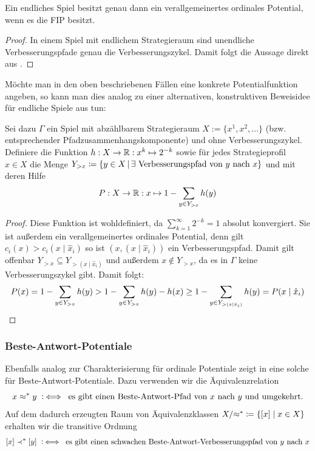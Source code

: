 \begin{kor}\label{kor:CharExVerOrdFIP}
	Ein endliches Spiel besitzt genau dann ein verallgemeinertes ordinales Potential, wenn es die FIP besitzt.
\end{kor}

\begin{proof}
	In einem Spiel mit endlichem Strategieraum sind unendliche Verbesserungspfade genau die Verbesserungszykel. Damit folgt die Aussage direkt aus .
\end{proof}

\begin{bem}
	Möchte man in den oben beschriebenen Fällen eine konkrete Potentialfunktion angeben, so kann man dies analog zu einer alternativen, konstruktiven Beweisidee für endliche Spiele aus \cite[Abschnitt 5]{CongGamesPlayerSpecPayoff} tun:

	Sei dazu $\Gamma$ ein Spiel mit abzählbarem Strategieraum $X := \{x^1, x^2, \dots \}$ (bzw. entsprechender Pfadzusammenhangskomponente) und ohne Verbesserungszykel. Definiere die Funktion $h: X \to \mathbb{R}: x^k \mapsto 2^{-k}$ sowie für jedes Strategieprofil $x \in X$ die Menge $Y_{>x} \coloneqq \left\{y \in X \,\middle|\, \exists \text{ Verbesserungspfad von } y \text{ nach } x\right\}$ und mit deren Hilfe
	\[P: X \to \mathbb{R}: x \mapsto 1 - \sum_{y \in Y_{>x}} h(y)\]
\end{bem}

\begin{proof}
	Diese Funktion ist wohldefiniert, da $\sum_{k=1}^{\infty} 2^{-k} = 1$ absolut konvergiert. Sie ist außerdem ein verallgemeinertes ordinales Potential, denn gilt $c_i(x) > c_i(x \mid \hat{x}_i)$ so ist $(x, (x \mid \hat{x}_i))$ ein Verbesserungspfad. Damit gilt offenbar $Y_{>x} \subseteq Y_{>(x \mid \hat{x}_i)}$ und außerdem $x \notin Y_{>x}$, da es in $\Gamma$ keine Verbesserungszykel gibt. Damit folgt:
		\[P(x) = 1 - \sum_{y \in Y_{>x}} h(y) > 1 - \sum_{y \in Y_{>x}} h(y) - h(x) \geq 1 - \sum_{y \in Y_{>(x \mid \hat{x}_i)}}h(y) = P(x \mid \hat{x}_i)\qedhere\]
\end{proof}


\subsubsection{Beste-Antwort-Potentiale}

Ebenfalls analog zur Charakterisierung für ordinale Potentiale zeigt \citeauthor{BestRespPot} in \cite[Theorem 3.1]{BestRespPot} eine solche für Beste-Antwort-Potentiale. Dazu verwenden wir die Äquivalenzrelation
	\[x \approx^\ast y \mathbin{~\mathop:\!\!\iff} \text{ es gibt einen Beste-Antwort-Pfad von $x$ nach $y$ und umgekehrt}.\]
Auf dem dadurch erzeugten Raum von Äquivalenzklassen $X/{\approx^\ast} \coloneqq \left\lbrace[x] \mid x \in X\right\rbrace$ erhalten wir die transitive Ordnung
\[[x] \prec^\ast [y] \mathbin{~\mathop:\!\!\iff} \text{ es gibt einen schwachen Beste-Antwort-Verbesserungspfad von $y$ nach $x$}\]


